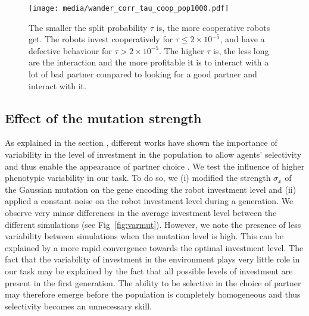 \documentclass[letterpaper]{article}
\begin{document}
\begin{figure}[tbhp]
    \begin{center}
        \texttt{[image: media/wander\_corr\_tau\_coop\_pop1000.pdf]}
        \vskip 0.25cm
        \caption{The smaller the split probability $\tau$ is, the more cooperative robots get. The robots invest cooperatively for $\tau \leq 2\times 10 ^{-5}$, and have a defective behaviour for $\tau > 2 \times 10^{-5}$. The higher $\tau$ is, the less long are the interaction and the more profitable it is to interact with a lot of bad partner compared to looking for a good partner and interact with it.
        }
        \label{fig:corr_tau_comp}
    \end{center}
\end{figure}


\subsection{Effect of the mutation strength}

As explained in the section , different works have shown the importance of variability in the level of investment in the population to allow agents' selectivity and thus enable the appearance of partner choice \citep{McNamara2010c}.
We test the influence of higher phenotypic variability in our task. %
To do so, we (i) modified the strength $\sigma_x$ of the Gaussian mutation on the gene encoding the robot investment level and (ii) applied a constant noise on the robot investment level during a generation. %
We observe very minor differences in the average investment level between the different simulations (see Fig~\ref{fig:varmut}). However, we note the presence of less variability between simulations when the mutation level is high. This can be explained by a more rapid convergence towards the optimal investment level. %
The fact that the variability of investment in the environment plays very little role in our task may be explained by the fact that all possible levels of investment are present in the first generation. The ability to be selective in the choice of partner may therefore emerge before the population is completely homogeneous and thus selectivity becomes an unnecessary skill. %
\end{document}

